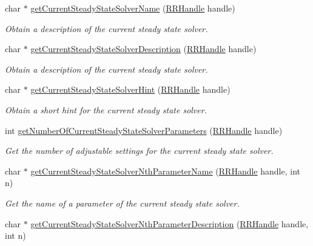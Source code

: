 \begin{DoxyCompactItemize}
char $\ast$ \hyperlink{group__simopts_gac0d4601ea3af03c7c15353bb10bbd95f}{get\+Current\+Steady\+State\+Solver\+Name} (\hyperlink{rrc__types_8h_a1d68f0592372208fa5a5f2799ea4b3ae}{R\+R\+Handle} handle)
\begin{DoxyCompactList}\small\item\em Obtain a description of the current steady state solver. \end{DoxyCompactList}\item 
char $\ast$ \hyperlink{group__simopts_ga408c62750f0976ed81a84fbeb77980df}{get\+Current\+Steady\+State\+Solver\+Description} (\hyperlink{rrc__types_8h_a1d68f0592372208fa5a5f2799ea4b3ae}{R\+R\+Handle} handle)
\begin{DoxyCompactList}\small\item\em Obtain a description of the current steady state solver. \end{DoxyCompactList}\item 
char $\ast$ \hyperlink{group__simopts_ga7e0bc7da3c46b6869fc086ccea75d052}{get\+Current\+Steady\+State\+Solver\+Hint} (\hyperlink{rrc__types_8h_a1d68f0592372208fa5a5f2799ea4b3ae}{R\+R\+Handle} handle)
\begin{DoxyCompactList}\small\item\em Obtain a short hint for the current steady state solver. \end{DoxyCompactList}\item 
int \hyperlink{group__simopts_ga669437dfce773b8fa6f72bd3d26748b0}{get\+Number\+Of\+Current\+Steady\+State\+Solver\+Parameters} (\hyperlink{rrc__types_8h_a1d68f0592372208fa5a5f2799ea4b3ae}{R\+R\+Handle} handle)
\begin{DoxyCompactList}\small\item\em Get the number of adjustable settings for the current steady state solver. \end{DoxyCompactList}\item 
char $\ast$ \hyperlink{group__simopts_gae7bae8b195623a1f170422b4257bc97b}{get\+Current\+Steady\+State\+Solver\+Nth\+Parameter\+Name} (\hyperlink{rrc__types_8h_a1d68f0592372208fa5a5f2799ea4b3ae}{R\+R\+Handle} handle, int n)
\begin{DoxyCompactList}\small\item\em Get the name of a parameter of the current steady state solver. \end{DoxyCompactList}\item 
char $\ast$ \hyperlink{group__simopts_gae8ec0f65a3425758d77f43ed8ce21ce3}{get\+Current\+Steady\+State\+Solver\+Nth\+Parameter\+Description} (\hyperlink{rrc__types_8h_a1d68f0592372208fa5a5f2799ea4b3ae}{R\+R\+Handle} handle, int n)

\end{DoxyCompactItemize}
